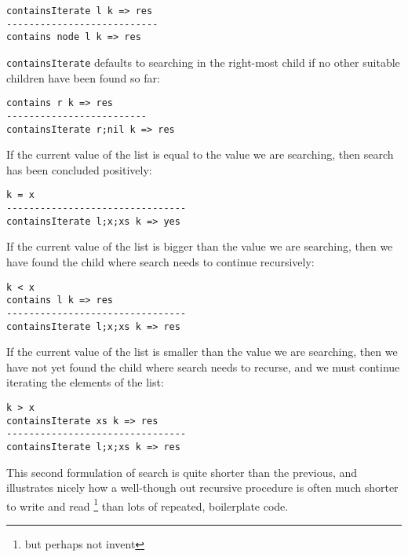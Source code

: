 \begin{lstlisting}
containsIterate l k => res
---------------------------
contains node l k => res
\end{lstlisting}

\texttt{containsIterate} defaults to searching in the right-most child if no other suitable children have been found so far:

\begin{lstlisting}
contains r k => res
-------------------------
containsIterate r;nil k => res
\end{lstlisting}

If the current value of the list is equal to the value we are searching, then search has been concluded positively:

\begin{lstlisting}
k = x
--------------------------------
containsIterate l;x;xs k => yes
\end{lstlisting}

If the current value of the list is bigger than the value we are searching, then we have found the child where search needs to continue recursively:

\begin{lstlisting}
k < x
contains l k => res
--------------------------------
containsIterate l;x;xs k => res
\end{lstlisting}

If the current value of the list is smaller than the value we are searching, then we have not yet found the child where search needs to recurse, and we must continue iterating the elements of the list:

\begin{lstlisting}
k > x
containsIterate xs k => res
--------------------------------
containsIterate l;x;xs k => res
\end{lstlisting}


This second formulation of search is quite shorter than the previous, and illustrates nicely how a well-though out recursive procedure is often much shorter to write and read \footnote{but perhaps not invent} than lots of repeated, boilerplate code.
